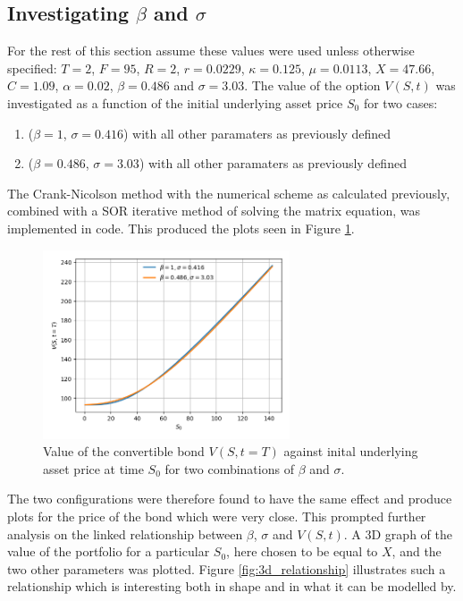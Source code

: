 \documentclass{article}
\begin{document}
\subsection{Investigating $\beta$ and $\sigma$}
For the rest of this section assume these values were used unless otherwise specified:
$T=2$, $F=95$, $R=2$, $r=0.0229$, $\kappa=0.125$, $\mu=0.0113$, $X=47.66$, $C=1.09$, $\alpha=0.02$, $\beta=0.486$ and $\sigma=3.03$.
The value of the option $V(S,t)$ was investigated as a function of the initial underlying asset
price $S_0$ for two cases:
\begin{enumerate}[1)]
  \item ($\beta=1$, $\sigma=0.416$) with all other paramaters as previously defined
  \item ($\beta=0.486$, $\sigma=3.03$) with all other paramaters as previously defined
\end{enumerate}
The Crank-Nicolson method with the numerical scheme as calculated previously, combined with a SOR iterative method of solving the matrix equation, was implemented in code.
This produced the plots seen in Figure \ref{fig:varying_s}.
\clearpage
\begin{figure}[!th]
\includegraphics[width=0.65\textwidth,center]{../images/european_varying_s.png}
\caption{Value of the convertible bond $V(S,t=T)$ against inital underlying asset price at time $S_0$ for two combinations of $\beta$ and $\sigma$.}
\label{fig:varying_s}
\end{figure}
The two configurations were therefore found to have the same effect and produce plots for the price of the bond which were very close.
This prompted further analysis on the linked relationship between $\beta$, $\sigma$ and $V(S,t)$.
A 3D graph of the value of the portfolio for a particular $S_0$, here chosen to be equal to $X$, and the two other parameters was plotted.
Figure \ref{fig:3d_relationship} illustrates such a relationship which is interesting both in shape and in what it can be modelled by.
\end{document}

